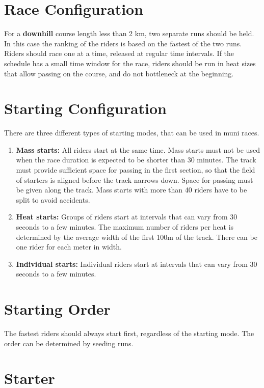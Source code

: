 \section{Race Configuration}

For a \textbf{downhill} course length less than 2 km, two separate runs should be held.
In this case the ranking of the riders is based on the fastest of the two runs.
Riders should race one at a time, released at regular time intervals.
If the schedule has a small time window for the race, riders should be run in heat sizes that allow passing on the course, and do not bottleneck at the beginning.

\section{Starting Configuration}

There are three different types of starting modes, that can be used in muni races.
\begin{enumerate}
\item \textbf{Mass starts:} All riders start at the same time.
Mass starts must not be used when the race duration is expected to be shorter than 30 minutes.
The track must provide sufficient space for passing in the first section, so that the field of starters is aligned before the track narrows down.
Space for passing must be given along the track.
Mass starts with more than 40 riders have to be split to avoid accidents.
\item \textbf{Heat starts:} Groups of riders start at intervals that can vary from 30 seconds to a few minutes.
The maximum number of riders per heat is determined by the average width of the first 100m of the track.
There can be one rider for each meter in width.
\item \textbf{Individual starts:} Individual riders start at intervals that can vary from 30 seconds to a few minutes.
\end{enumerate}

\section{Starting Order}

The fastest riders should always start first, regardless of the starting mode.
The order can be determined by seeding runs.


\section{Starter}

